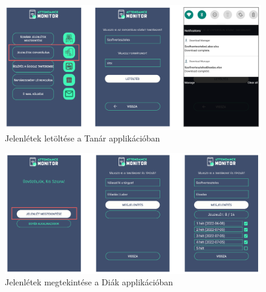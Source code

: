 \begin{figure}
	\includegraphics[width=\textwidth]{figures/gy6.png}
	\caption{Jelenlétek letöltése a Tanár applikációban}
	\label{fig:gy6}
\end{figure}

\begin{figure}
	\includegraphics[width=\textwidth]{figures/gy7.png}
	\caption{Jelenlétek megtekintése a Diák applikációban}
	\label{fig:gy7}
\end{figure}